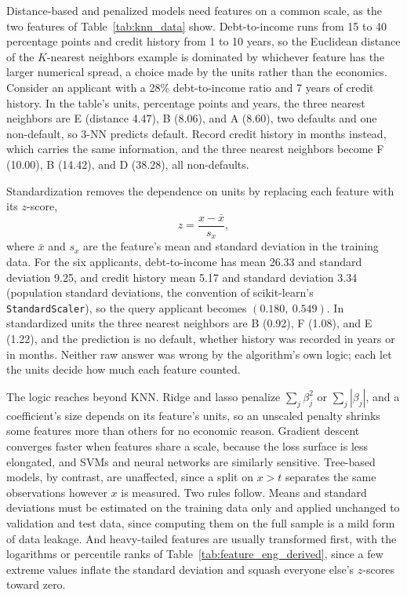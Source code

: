 \documentclass[../ai_in_finance]{subfiles}
\begin{document}
Distance-based and penalized models need features on a common scale, as the two features of Table~\ref{tab:knn_data} show. Debt-to-income runs from 15 to 40 percentage points and credit history from 1 to 10 years, so the Euclidean distance of the $K$-nearest neighbors example is dominated by whichever feature has the larger numerical spread, a choice made by the units rather than the economics. Consider an applicant with a 28\% debt-to-income ratio and 7 years of credit history. In the table's units, percentage points and years, the three nearest neighbors are E (distance 4.47), B (8.06), and A (8.60), two defaults and one non-default, so 3-NN predicts default. Record credit history in months instead, which carries the same information, and the three nearest neighbors become F (10.00), B (14.42), and D (38.28), all non-defaults.

Standardization removes the dependence on units by replacing each feature with its $z$-score,
\begin{equation*}
z = \frac{x - \bar x}{s_x},
\end{equation*}
where $\bar x$ and $s_x$ are the feature's mean and standard deviation in the training data. For the six applicants, debt-to-income has mean 26.33 and standard deviation 9.25, and credit history mean 5.17 and standard deviation 3.34 (population standard deviations, the convention of scikit-learn's \texttt{StandardScaler}), so the query applicant becomes $(0.180,\ 0.549)$. In standardized units the three nearest neighbors are B (0.92), F (1.08), and E (1.22), and the prediction is no default, whether history was recorded in years or in months. Neither raw answer was wrong by the algorithm's own logic; each let the units decide how much each feature counted.

The logic reaches beyond KNN. Ridge and lasso penalize $\sum_j \beta_j^2$ or $\sum_j |\beta_j|$, and a coefficient's size depends on its feature's units, so an unscaled penalty shrinks some features more than others for no economic reason. Gradient descent converges faster when features share a scale, because the loss surface is less elongated, and SVMs and neural networks are similarly sensitive. Tree-based models, by contrast, are unaffected, since a split on $x > t$ separates the same observations however $x$ is measured. Two rules follow. Means and standard deviations must be estimated on the training data only and applied unchanged to validation and test data, since computing them on the full sample is a mild form of data leakage. And heavy-tailed features are usually transformed first, with the logarithms or percentile ranks of Table~\ref{tab:feature_eng_derived}, since a few extreme values inflate the standard deviation and squash everyone else's $z$-scores toward zero.
\end{document}
